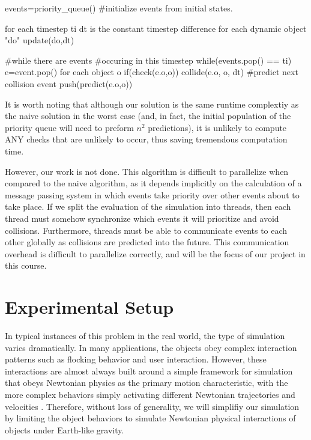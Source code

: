\documentclass[conference]{IEEEtran}
\begin{document}
\begin{verbatimtab}[3]
events=priority_queue()
#initialize events from initial states.

for each timestep ti
	dt is the constant timestep difference
	for each dynamic object "do"
		update(do,dt)

	#while there are events 
	#occuring in this timestep
	while(events.pop() == ti)
		e=event.pop()  
		for each object o
			if(check(e.o,o))
				collide(e.o, o, dt)
				#predict next collision event
				push(predict(e.o,o)) 
\end{verbatimtab}

It is worth noting that although our solution is the same runtime complextiy as the naive solution in the worst case (and, in fact, the initial population of the priority queue will need to preform $n^2$ predictions), it is unlikely to compute ANY checks that are unlikely to occur, thus saving tremendous computation time.  

However, our work is not done.  This algorithm is difficult to parallelize when compared to the naive algorithm, as it depends implicitly on the calculation of a message passing system in which events take priority over other events about to take place. If we split the evaluation of the simulation into threads, then each thread must somehow synchronize which events it will prioritize and avoid collisions.  Furthermore, threads must be able to communicate events to each other globally as collisions are predicted into the future.  This communication overhead is difficult to parallelize correctly, and will be the focus of our project in this course.

\section{Experimental Setup}%

In typical instances of this problem in the real world, the type of simulation varies dramatically. In many applications, the objects obey complex interaction patterns such as flocking behavior and user interaction.  However, these interactions are almost always built around a simple framework for simulation that obeys Newtonian physics as the primary motion characteristic, with the more complex
behaviors simply activating different Newtonian trajectories and velocities \cite{Jadbabaie02coordinationof}.  Therefore, without loss of generality, we will simplifiy our simulation by limiting the object behaviors to simulate Newtonian physical interactions of objects under Earth-like gravity.
\end{document}
